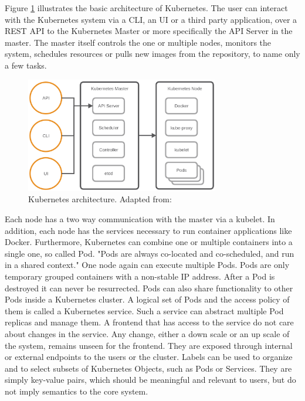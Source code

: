 Figure \ref{fig:kubernetes_architecture} illustrates the basic architecture of Kubernetes.
The user can interact with the Kubernetes system via a \ac{CLI}, an \ac{UI} or a third party application, over a \ac{REST} \ac{API} to the Kubernetes Master or more specifically the \ac{API} Server in the master.
The master itself controls the one or multiple nodes, monitors the system, schedules resources or pulls new images from the repository, to name only a few tasks.

\begin{figure}[H]
    \centering
    \includegraphics[width=0.75\textwidth]{resources/images/kubernetes_architecture.png}
    \caption[Kubernetes architecture]{Kubernetes architecture. Adapted from: \autocite[p. 4]{MSV:2016}}
    \label{fig:kubernetes_architecture}
\end{figure}

Each node has a two way communication with the master via a kubelet.
In addition, each node has the services necessary to run container applications like Docker.
Furthermore, Kubernetes can combine one or multiple containers into a single one, so called Pod.\autocite[cf.][p. 7]{Mulyana:2016}
"Pods are always co-located and co-scheduled, and run in a shared context."\autocite{Kubernetes:pods:2016}
One node again can execute multiple Pods.
Pods are only temporary grouped containers with a non-stable \ac{IP} address.
After a Pod is destroyed it can never be resurrected.
Pods can also share functionality to other Pods inside a Kubernetes cluster.
A logical set of Pods and the access policy of them is called a Kubernetes service.
Such a service can abstract multiple Pod replicas and manage them.
A frontend that has access to the service do not care about changes in the service.
Any change, either a down scale or an up scale of the system, remains unseen for the frontend.
They are exposed through internal or external endpoints to the users or the cluster.\autocite[cf.][p. 11]{MSV:2016}
Labels can be used to organize and to select subsets of Kubernetes Objects, such as Pods or Services.\autocite[cf.]{Kubernetes:labels:2016}
They are simply key-value pairs, which should be meaningful and relevant to users, but do not imply semantics to the core system.\autocite[cf.]{Kubernetes:labels:2016}


